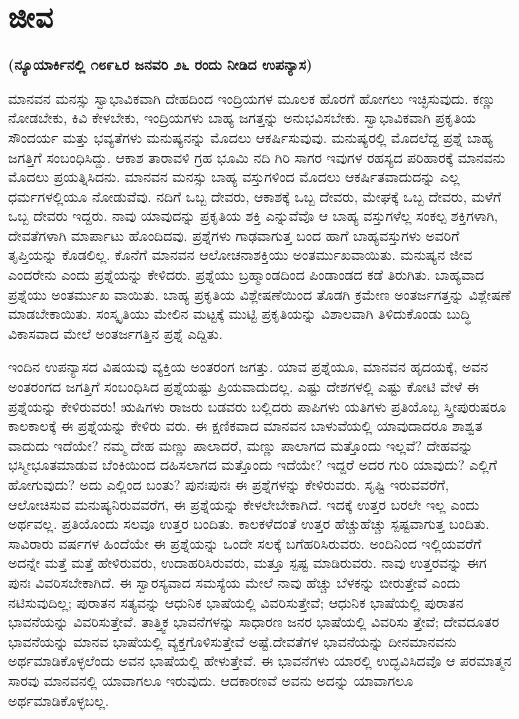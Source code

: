 \chapter{ಜೀವ}

\centerline{\textbf{(ನ್ಯೂಯಾರ್ಕಿನಲ್ಲಿ ೧೮೯೬ರ ಜನವರಿ ೨೬ ರಂದು ನೀಡಿದ ಉಪನ್ಯಾಸ)}}

ಮಾನವನ ಮನಸ್ಸು ಸ್ವಾಭಾವಿಕವಾಗಿ ದೇಹದಿಂದ ಇಂದ್ರಿಯಗಳ ಮೂಲಕ ಹೊರಗೆ ಹೋಗಲು ಇಚ್ಛಿಸುವುದು. ಕಣ್ಣು ನೋಡಬೇಕು, ಕಿವಿ ಕೇಳಬೇಕು, ಇಂದ್ರಿಯಗಳು ಬಾಹ್ಯ ಜಗತ್ತನ್ನು ಅನುಭವಿಸಬೇಕು. ಸ್ವಾಭಾವಿಕವಾಗಿ ಪ್ರಕೃತಿಯ ಸೌಂದರ್ಯ ಮತ್ತು ಭವ್ಯತೆಗಳು ಮನುಷ್ಯನನ್ನು ಮೊದಲು ಆಕರ್ಷಿಸುವುವು. ಮನುಷ್ಯರಲ್ಲಿ ಮೊದಲೆದ್ದ ಪ್ರಶ್ನೆ ಬಾಹ್ಯ ಜಗತ್ತಿಗೆ ಸಂಬಂಧಿಸಿದ್ದು. ಆಕಾಶ ತಾರಾವಳಿ ಗ್ರಹ ಭೂಮಿ ನದಿ ಗಿರಿ ಸಾಗರ ಇವುಗಳ ರಹಸ್ಯದ ಪರಿಹಾರಕ್ಕೆ ಮಾನವನು ಮೊದಲು ಪ್ರಯತ್ನಿಸಿದನು. ಮಾನವನ ಮನಸ್ಸು ಬಾಹ್ಯ ವಸ್ತುಗಳಿಂದ ಮೊದಲು ಆಕರ್ಷಿತವಾದುದನ್ನು ಎಲ್ಲ ಧರ್ಮಗಳಲ್ಲಿಯೂ ನೋಡುವೆವು. ನದಿಗೆ ಒಬ್ಬ ದೇವರು, ಆಕಾಶಕ್ಕೆ ಒಬ್ಬ ದೇವರು, ಮೇಘಕ್ಕೆ ಒಬ್ಬ ದೇವರು, ಮಳೆಗೆ ಒಬ್ಬ ದೇವರು ಇದ್ದರು. ನಾವು ಯಾವುದನ್ನು ಪ್ರಕೃತಿಯ ಶಕ್ತಿ ಎನ್ನುವೆವೊ ಆ ಬಾಹ್ಯ ವಸ್ತುಗಳೆಲ್ಲ ಸಂಕಲ್ಪ ಶಕ್ತಿಗಳಾಗಿ, ದೇವತೆಗಳಾಗಿ ಮಾರ್ಪಾಟು ಹೊಂದಿದವು. ಪ್ರಶ್ನೆಗಳು ಗಾಢವಾಗುತ್ತ ಬಂದ ಹಾಗೆ ಬಾಹ್ಯವಸ್ತುಗಳು ಅವರಿಗೆ ತೃಪ್ತಿಯನ್ನು ಕೊಡಲಿಲ್ಲ. ಕೊನೆಗೆ ಮಾನವನ ಆಲೋಚನಾಶಕ್ತಿಯು ಅಂತರ್ಮುಖವಾಯಿತು. ಮನುಷ್ಯನ ಜೀವ ಎಂದರೇನು ಎಂದು ಪ್ರಶ್ನೆಯನ್ನು ಕೇಳಿದರು. ಪ್ರಶ್ನೆಯು ಬ್ರಹ್ಮಾಂಡದಿಂದ ಪಿಂಡಾಂಡದ ಕಡೆ ತಿರುಗಿತು. ಬಾಹ್ಯವಾದ ಪ್ರಶ್ನೆಯು ಅಂತರ್ಮುಖ ವಾಯಿತು. ಬಾಹ್ಯ ಪ್ರಕೃತಿಯ ವಿಶ್ಲೇಷಣೆಯಿಂದ ತೊಡಗಿ ಕ್ರಮೇಣ ಅಂತರ್ಜಗತ್ತನ್ನು ವಿಶ್ಲೇಷಣೆ ಮಾಡಬೇಕಾಯಿತು. ಸಂಸ್ಕೃತಿಯು ಮೇಲಿನ ಮಟ್ಟಕ್ಕೆ ಮುಟ್ಟಿ ಪ್ರಕೃತಿಯನ್ನು ವಿಶಾಲವಾಗಿ ತಿಳಿದುಕೊಂಡು ಬುದ್ಧಿ ವಿಕಾಸವಾದ ಮೇಲೆ ಅಂತರ್ಜಗತ್ತಿನ ಪ್ರಶ್ನೆ ಎದ್ದಿತು.

ಇಂದಿನ ಉಪನ್ಯಾಸದ ವಿಷಯವು ವ್ಯಕ್ತಿಯ ಅಂತರಂಗ ಜಗತ್ತು. ಯಾವ ಪ್ರಶ್ನೆಯೂ, ಮಾನವನ ಹೃದಯಕ್ಕೆ, ಅವನ ಅಂತರಂಗದ ಜಗತ್ತಿಗೆ ಸಂಬಂಧಿಸಿದ ಪ್ರಶ್ನೆಯಷ್ಟು ಪ್ರಿಯವಾದುದಲ್ಲ. ಎಷ್ಟು ದೇಶಗಳಲ್ಲಿ ಎಷ್ಟು ಕೋಟಿ ವೇಳೆ ಈ ಪ್ರಶ್ನೆಯನ್ನು ಕೇಳಿರುವರು! ಋಷಿಗಳು ರಾಜರು ಬಡವರು ಬಲ್ಲಿದರು ಪಾಪಿಗಳು ಯತಿಗಳು ಪ್ರತಿಯೊಬ್ಬ ಸ್ತ್ರೀಪುರುಷರೂ ಕಾಲಕಾಲಕ್ಕೆ ಈ ಪ್ರಶ್ನೆಯನ್ನು ಕೇಳಿರು ವರು. ಈ ಕ್ಷಣಿಕವಾದ ಮಾನವನ ಬಾಳುವೆಯಲ್ಲಿ ಯಾವುದಾದರೂ ಶಾಶ್ವತ ವಾದುದು ಇದೆಯೇ? ನಮ್ಮ ದೇಹ ಮಣ್ಣು ಪಾಲಾದರೆ, ಮಣ್ಣು ಪಾಲಾಗದ ಮತ್ತೊಂದು ಇಲ್ಲವೆ? ದೇಹವನ್ನು ಭಸ್ಮೀಭೂತಮಾಡುವ ಬೆಂಕಿಯಿಂದ ದಹಿಸಲಾಗದ ಮತ್ತೊಂದು ಇದೆಯೇ? ಇದ್ದರೆ ಅದರ ಗುರಿ ಯಾವುದು? ಎಲ್ಲಿಗೆ ಹೋಗುವುದು? ಅದು ಎಲ್ಲಿಂದ ಬಂತು? ಪುನಃಪುನಃ ಈ ಪ್ರಶ್ನೆಗಳನ್ನು ಕೇಳಿರುವರು. ಸೃಷ್ಟಿ ಇರುವವರೆಗೆ, ಆಲೋಚಿಸುವ ಮನುಷ್ಯನಿರುವವರೆಗ, ಈ ಪ್ರಶ್ನೆಯನ್ನು ಕೇಳಲೇಬೇಕಾಗಿದೆ. ಇದಕ್ಕೆ ಉತ್ತರ ಬರಲೇ ಇಲ್ಲ ಎಂದು ಅರ್ಥವಲ್ಲ. ಪ್ರತಿಯೊಂದು ಸಲವೂ ಉತ್ತರ ಬಂದಿತು. ಕಾಲಕಳೆದಂತೆ ಉತ್ತರ ಹೆಚ್ಚುಹೆಚ್ಚು ಸ್ಪಷ್ಟವಾಗುತ್ತ ಬಂದಿತು. ಸಾವಿರಾರು ವರ್ಷಗಳ ಹಿಂದೆಯೇ ಈ ಪ್ರಶ್ನೆಯನ್ನು ಒಂದೇ ಸಲಕ್ಕೆ ಬಗೆಹರಿಸಿರುವರು. ಅಂದಿನಿಂದ ಇಲ್ಲಿಯವರೆಗೆ ಅದನ್ನೇ ಮತ್ತೆ ಮತ್ತೆ ಹೇಳಿರುವರು, ಉದಾಹರಿಸಿರುವರು, ಮತ್ತೂ ಸ್ಪಷ್ಟ ಮಾಡಿರುವರು. ನಾವು ಉತ್ತರವನ್ನು ಈಗ ಪುನಃ ವಿವರಿಸಬೇಕಾಗಿದೆ. ಈ ಸ್ವಾರಸ್ಯವಾದ ಸಮಸ್ಯೆಯ ಮೇಲೆ ನಾವು ಹೆಚ್ಚು ಬೆಳಕನ್ನು ಬೀರುತ್ತೇವೆ ಎಂದು ನಟಿಸುವುದಿಲ್ಲ; ಪುರಾತನ ಸತ್ಯವನ್ನು ಆಧುನಿಕ ಭಾಷೆಯಲ್ಲಿ ವಿವರಿಸುತ್ತೇವೆ; ಆಧುನಿಕ ಭಾಷೆಯಲ್ಲಿ ಪುರಾತನ ಭಾವನೆಯನ್ನು ವಿವರಿಸುತ್ತೇವೆ. ತಾತ್ತ್ವಿಕ ಭಾವನೆಗಳನ್ನು ಸಾಧಾರಣ ಜನರ ಭಾಷೆಯಲ್ಲಿ ವಿವರಿಸು ತ್ತೇವೆ; ದೇವದೂತರ ಭಾವನೆಯನ್ನು ಮಾನವ ಭಾಷೆಯಲ್ಲಿ ವ್ಯಕ್ತಗೊಳಿಸುತ್ತೇವೆ ಅಷ್ಟೆ.ದೇವತೆಗಳ ಭಾವನೆಯನ್ನು ದೀನಮಾನವನು ಅರ್ಥಮಾಡಿಕೊಳ್ಳಲೆಂದು ಅವನ ಭಾಷೆಯಲ್ಲಿ ಹೇಳುತ್ತೇವೆ. ಈ ಭಾವನೆಗಳು ಯಾರಲ್ಲಿ ಉದ್ಭವಿಸಿದವೊ ಆ ಪರಮಾತ್ಮನ ಸಾರವು ಮಾನವನಲ್ಲಿ ಯಾವಾಗಲೂ ಇರುವುದು. ಆದಕಾರಣವೆ ಅವನು ಅದನ್ನು ಯಾವಾಗಲೂ ಅರ್ಥಮಾಡಿಕೊಳ್ಳಬಲ್ಲ.

